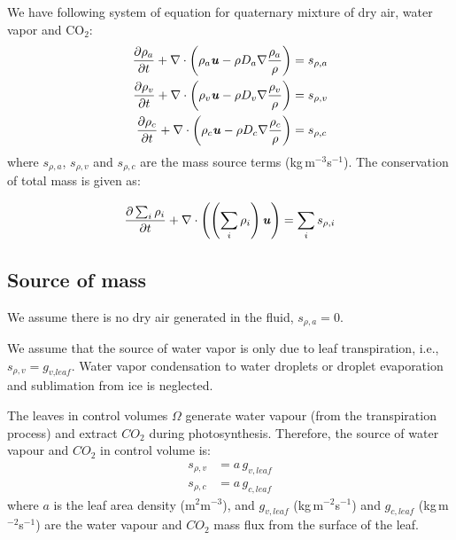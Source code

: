 We have following system of equation for quaternary mixture of dry air, water vapor and CO$_2$:
\begin{align}
\frac{{\partial {\rho _a}}}{{\partial t}} + \nabla  \cdot \left( {{\rho _a}{\textbf{\textit{u}}} - {\rho }{D_a}\nabla \frac{{{\rho _a}}}{{{\rho }}}} \right) &= {s_{\rho ,a}} \label{eq:comaa}\\
\frac{{\partial {\rho _v}}}{{\partial t}} + \nabla  \cdot \left( {{\rho _v}{\textbf{\textit{u}}} - {\rho }{D_v}\nabla \frac{{{\rho _v}}}{{{\rho }}}} \right) &= {s_{\rho ,v}} \label{eq:comvv}\\
\frac{{\partial {\rho _{c}}}}{{\partial t}} + \nabla  \cdot \left( {{\rho _{c}}{\textbf{\textit{u}}} - {\rho }{D_c}\nabla \frac{{{\rho _{c}}}}{{{\rho }}}} \right) &= {s_{\rho ,{c}}}
\end{align}
where ${s_{\rho ,a}}$, ${s_{\rho ,v}}$ and ${s_{\rho ,c}}$ are the mass source terms (kg\,m$^{-3}$s$^{-1}$). The conservation of total mass is given as: 

\begin{equation}
\frac{\partial \sum_i\rho _i}{\partial t} + \nabla  \cdot \left( \left(\sum_i\rho _i\right)\textbf{\textit{u}}\right) = \sum_i s_{\rho ,i}
\end{equation}

\subsection{Source of mass}

\begin{assumption}
	We assume there is no dry air generated in the fluid, ${s_{\rho ,a}} = 0$. 
\end{assumption}

\begin{assumption}
	We assume that the source of water vapor is only due to leaf transpiration, i.e., $s_{\rho,v} = g_{\textit{v,leaf}}$. Water vapor condensation to water droplets or droplet evaporation and sublimation from ice is neglected.
\end{assumption}

The leaves in control volumes $\Omega$ generate water vapour (from the transpiration process) and extract $CO_2$ during photosynthesis. Therefore, the source of water vapour and $CO_2$ in control volume is:
\begin{align}
{s_{\rho ,v}} &= a\, g_{v,leaf} \label{eq:gvsource}\\
{s_{\rho ,c}} &= a\, g_{c,leaf}
\end{align}
where $a$ is the leaf area density (m$^2$m$^{-3}$), and $g_{v,\mathit{leaf}}$ (kg\,m$^{-2}$s$^{-1}$) and $g_{c,\mathit{leaf}}$ (kg\,m$^{-2}$s$^{-1}$) are the water vapour and $CO_2$ mass flux from the surface of the leaf.

